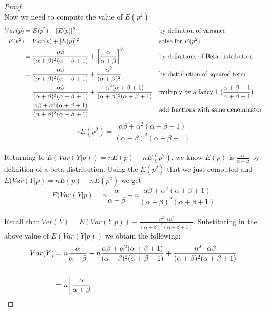\documentclass[11pt]{article}
\begin{document}
\begin{enumerate}
\begin{enumerate}[(a)]
\begin{proof}
            \\Now we need to compute the value of \(E(p^2)\)
            \begin{align}
                Var(p) &= E(p^2) - [E(p)]^2 \notag && \text{by definition of variance}
                \\E(p^2) &= Var(p) + [E(p)]^2 \notag && \text{solve for \(E(p^2)\)}
                \\&= \frac{\alpha \beta}{(\alpha + \beta)^2 (\alpha + \beta + 1)} + \bigg[\frac{\alpha}{\alpha + \beta}\bigg]^2 \notag && \text{by definitions of Beta distribution}
                \\&= \frac{\alpha \beta}{(\alpha + \beta)^2 (\alpha + \beta + 1)} + \frac{\alpha^2}{(\alpha + \beta)^2} \notag && \text{by distribution of squared term}
                \\&= \frac{\alpha \beta}{(\alpha + \beta)^2 (\alpha + \beta + 1)} + \frac{\alpha^2 (\alpha + \beta + 1)}{(\alpha + \beta)^2 (\alpha + \beta + 1)} \notag && \text{multiply by a fancy 1 (\(\frac{\alpha + \beta + 1}{\alpha + \beta + 1}\))}
                \\&= \frac{\alpha \beta + \alpha^2 (\alpha + \beta + 1)}{(\alpha + \beta)^2 (\alpha + \beta + 1)} \notag && \text{add fractions with same denominator}
            \end{align}
            $$\therefore E(p^2) = \frac{\alpha \beta + \alpha^2 (\alpha + \beta + 1)}{(\alpha + \beta)^2 (\alpha + \beta + 1)}$$
            \\Returning to \(E(Var(Y|p)) = n E(p) - n E(p^2)\), we know \(E(p)\) is \(\frac{\alpha}{\alpha + \beta}\) by definition of a beta distribution. Using the \(E(p^2)\) that we just computed and \(E(Var(Y|p) = n E(p) - n E(p^2)\) we get
            $$E(Var(Y|p) = n \frac{\alpha}{\alpha + \beta} - n \frac{\alpha \beta + \alpha^2 (\alpha + \beta + 1)}{(\alpha + \beta)^2 (\alpha + \beta + 1)} $$
            \\Recall that \(Var(Y) = E(Var(Y|p)) + \frac{n^2 \cdot \alpha \beta}{(\alpha + \beta)^2 (\alpha + \beta + 1)}\). Substituting in the above value of \(E(Var(Y|p))\) we obtain the following: \\
            \begin{align}
                Var(Y) &= n \frac{\alpha}{\alpha + \beta}
                - n \frac{\alpha \beta + \alpha^2 (\alpha + \beta + 1)}{(\alpha + \beta)^2 (\alpha + \beta + 1)}
                + \frac{n^2 \cdot \alpha \beta}{(\alpha + \beta)^2 (\alpha + \beta + 1)} 
                \notag
                \\\notag\\&= n \bigg[ \frac{\alpha}{\alpha + \beta}

\end{align}
\end{proof}
\end{enumerate}
\end{enumerate}
\end{document}
